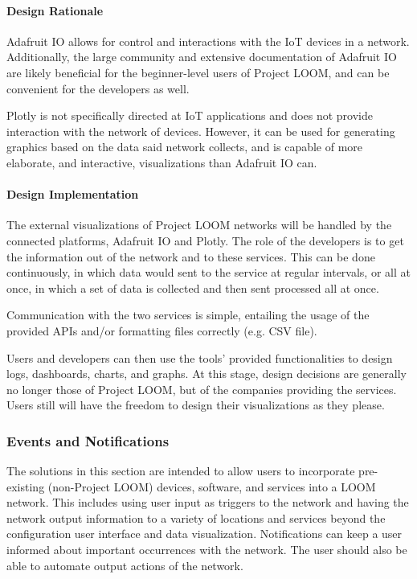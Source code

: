 \documentclass[onecolumn, draftclsnofoot,10pt, compsoc]{IEEEtran}
\begin{document}
\paragraph{Design Rationale}
    Adafruit IO allows for control and interactions with the IoT devices in a network. Additionally, the large community and extensive documentation of Adafruit IO are likely beneficial for the beginner-level users of Project LOOM, and can be convenient for the developers as well.

    Plotly is not specifically directed at IoT applications and does not provide interaction with the network of devices. However, it can be used for generating graphics based on the data said network collects, and is capable of more elaborate, and interactive, visualizations than Adafruit IO can.

\paragraph{Design Implementation}
    The external visualizations of Project LOOM networks will be handled by the connected platforms, Adafruit IO and Plotly. The role of the developers is to get the information out of the network and to these services. This can be done continuously, in which data would sent to the service at regular intervals, or all at once, in which a set of data is collected and then sent processed all at once. 

    Communication with the two services is simple, entailing the usage of the provided APIs and/or formatting files correctly (e.g. CSV file).

    Users and developers can then use the tools' provided functionalities to design logs, dashboards, charts, and graphs. At this stage, design decisions are generally no longer those of Project LOOM, but of the companies providing the services. Users still will have the freedom to design their visualizations as they please.


\subsubsection{Events and Notifications}
    The solutions in this section are intended to allow users to incorporate pre-existing (non-Project LOOM) devices, software, and services into a LOOM network. This includes using user input as triggers to the network and having the network output information to a variety of locations and services beyond the configuration user interface and data visualization. Notifications can keep a user informed about important occurrences with the network. The user should also be able to automate output actions of the network.
\end{document}
